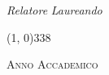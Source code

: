 \begin{titlepage}
\begin{center}
\begin{flushleft}
  \textit{Relatore} \hfill \textit{Laureando}\\
  \vspace{5pt}
  \profTitle \myProf \hfill \myName
\end{flushleft}
%
%

\vspace{30pt}

\line(1, 0){338} \\
\begin{normalsize}
\textsc{Anno Accademico \myAA}
\end{normalsize}

\end{center}
\end{titlepage}
